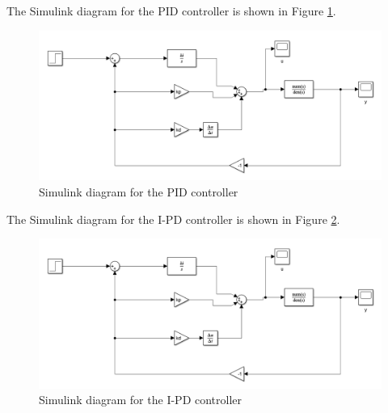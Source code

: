 \subsection{}
The Simulink diagram for the PID controller is shown in Figure \ref{fig:Q1PIDDiagram}.
\begin{figure}[h]
    \centering
    \includegraphics[width=0.8\linewidth]{Questions/Figures/Q1IPDDiagram.png}
    \caption{Simulink diagram for the PID controller}
    \label{fig:Q1PIDDiagram}
\end{figure}
The Simulink diagram for the I-PD controller is shown in Figure \ref{fig:Q1IPDDiagram}.
\begin{figure}[h]
    \centering
    \includegraphics[width=0.8\linewidth]{Questions/Figures/Q1IPDDiagram.png}
    \caption{Simulink diagram for the I-PD controller}
    \label{fig:Q1IPDDiagram}
\end{figure}

